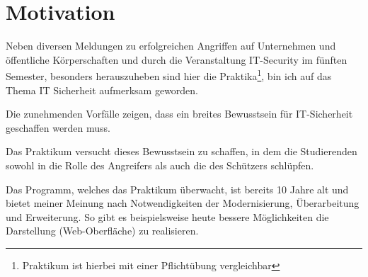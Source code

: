 \section{Motivation}
\label{sec:Motivation}
Neben diversen Meldungen zu erfolgreichen Angriffen auf Unternehmen und öffentliche Körperschaften und durch die Veranstaltung IT-Security im fünften Semester, besonders herauszuheben sind hier die Praktika\footnote{Praktikum ist hierbei mit einer Pflichtübung vergleichbar}, bin ich auf das Thema IT Sicherheit aufmerksam geworden. 

Die zunehmenden Vorfälle zeigen, dass ein breites Bewusstsein für IT-Sicherheit geschaffen werden muss.

Das Praktikum  versucht dieses Bewusstsein zu schaffen, in dem die Studierenden sowohl in die Rolle des Angreifers als auch die des Schützers schlüpfen.

Das Programm, welches das Praktikum überwacht, ist bereits 10 Jahre alt und bietet meiner Meinung nach Notwendigkeiten der Modernisierung, Überarbeitung und Erweiterung. 
So gibt es beispielsweise heute bessere Möglichkeiten die Darstellung (Web-Oberfläche) zu realisieren.